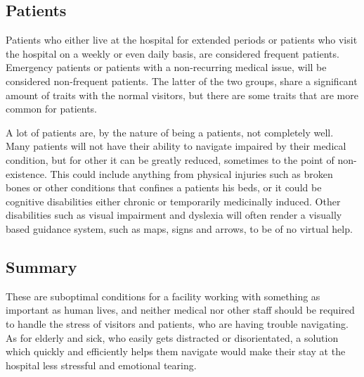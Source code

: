 \subsection{Patients}

Patients who either live at the hospital for extended periods or patients who visit the hospital on a weekly or even daily basis, are considered frequent patients. Emergency patients or patients with a non-recurring medical issue, will be considered non-frequent patients. The latter of the two groups, share a significant amount of traits with the normal visitors, but there are some traits that are more common for patients.

A lot of patients are, by the nature of being a patients, not completely well. Many patients will not have their ability to navigate impaired by their medical condition, but for other it can be greatly reduced, sometimes to the point of non-existence. This could include anything from physical injuries such as broken bones or other conditions that confines a patients his beds, or it could be cognitive disabilities either chronic or temporarily medicinally induced. Other disabilities such as visual impairment and dyslexia will often render a visually based guidance system, such as maps, signs and arrows, to be of no virtual help.\cite{visual_impairment}


\subsection{Summary}

These are suboptimal conditions for a facility working with something as important as human lives, and neither medical nor other staff should be required to handle the stress of visitors and patients, who are having trouble navigating. As for elderly and sick, who easily gets distracted or disorientated, a solution which quickly and efficiently helps them navigate would make their stay at the hospital less stressful and emotional tearing.
